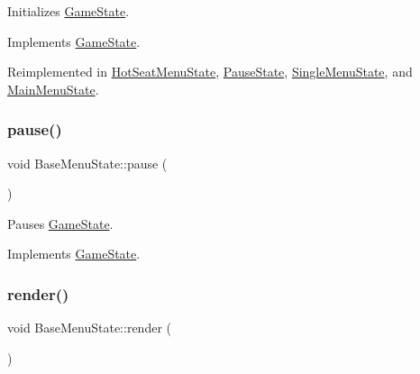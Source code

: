Initializes \mbox{\hyperlink{class_game_state}{Game\+State}}. 



Implements \mbox{\hyperlink{class_game_state_a10b6e6bb31591c70d08ffcee5f29fa81}{Game\+State}}.



Reimplemented in \mbox{\hyperlink{class_hot_seat_menu_state_a29beb4656c180d0cfc3b8ca20ae2d172}{Hot\+Seat\+Menu\+State}}, \mbox{\hyperlink{class_pause_state_a1e3378e3a16fc37c87c12f854d86005b}{Pause\+State}}, \mbox{\hyperlink{class_single_menu_state_a9494d848c97fe4d406f122f3d97bc38d}{Single\+Menu\+State}}, and \mbox{\hyperlink{class_main_menu_state_a83efff7f63145d55d1937e76970d2a25}{Main\+Menu\+State}}.

\mbox{\label{class_base_menu_state_a3ac8e688220c609b467ca4ae4c6600d6}} 
\subsubsection{\texorpdfstring{pause()}{pause()}}
{\footnotesize\ttfamily void Base\+Menu\+State\+::pause (\begin{DoxyParamCaption}{ }\end{DoxyParamCaption})\hspace{0.3cm}{\ttfamily [virtual]}}



Pauses \mbox{\hyperlink{class_game_state}{Game\+State}}. 



Implements \mbox{\hyperlink{class_game_state_aafc908582760099891b37bb380ddd87a}{Game\+State}}.

\mbox{\label{class_base_menu_state_a404076aa3e789fa75ba1bfe7752c1e18}} 
\subsubsection{\texorpdfstring{render()}{render()}}
{\footnotesize\ttfamily void Base\+Menu\+State\+::render (\begin{DoxyParamCaption}\item[{\mbox{\hyperlink{class_game_engine}{Game\+Engine}} $\ast$}]{ }\end{DoxyParamCaption})\hspace{0.3cm}{\ttfamily [virtual]}}



